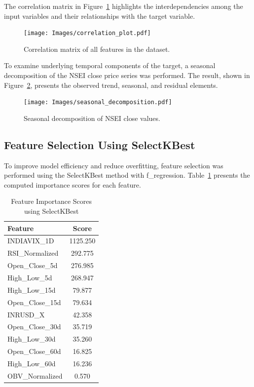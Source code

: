 The correlation matrix in Figure~\ref{fig:correlation_plot} highlights the interdependencies among the input variables and their relationships with the target variable.

\begin{figure}[h!]
    \centering
    \texttt{[image: Images/correlation\_plot.pdf]}
    \caption{Correlation matrix of all features in the dataset.}
    \label{fig:correlation_plot}
\end{figure}

To examine underlying temporal components of the target, a seasonal decomposition of the NSEI close price series was performed. The result, shown in Figure~\ref{fig:seasonal_decomposition}, presents the observed trend, seasonal, and residual elements.

\begin{figure}[h!]
    \centering
    \texttt{[image: Images/seasonal\_decomposition.pdf]}
    \caption{Seasonal decomposition of NSEI close values.}
    \label{fig:seasonal_decomposition}
\end{figure}

\subsection{Feature Selection Using SelectKBest}
To improve model efficiency and reduce overfitting, feature selection was performed using the SelectKBest method with \textsf{f\_regression}. Table~\ref{tab:feature_importance} presents the computed importance scores for each feature.

\begin{table}[h!]
\centering
\caption{Feature Importance Scores using SelectKBest}
\begin{tabular}{|l|c|}
\hline
\textbf{Feature} & \textbf{Score} \\ \hline
INDIAVIX\_1D     & 1125.250       \\ \hline
RSI\_Normalized  & 292.775        \\ \hline
Open\_Close\_5d  & 276.985        \\ \hline
High\_Low\_5d    & 268.947        \\ \hline
High\_Low\_15d   & 79.877         \\ \hline
Open\_Close\_15d & 79.634         \\ \hline
INRUSD\_X        & 42.358         \\ \hline
Open\_Close\_30d & 35.719         \\ \hline
High\_Low\_30d   & 35.260         \\ \hline
Open\_Close\_60d & 16.825         \\ \hline
High\_Low\_60d   & 16.236         \\ \hline
OBV\_Normalized  & 0.570          \\ \hline
\end{tabular}
\label{tab:feature_importance}
\end{table}


